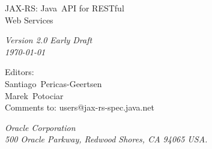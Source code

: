 \begin{titlepage}
\raggedleft

\vspace*{60pt}

{\Huge
\textsf{JAX-RS: Java\texttrademark\ API for RESTful\\\vspace{10pt}
 Web Services}}

\vspace{20pt}

{
\Large\textit{Version 2.0 Early Draft\\
\today}
}

\vspace{40pt}

{\large Editors:\\
Santiago\ Pericas-Geertsen\\
Marek\ Potociar\\
\vspace{10pt}Comments to: users@jax-rs-spec.java.net
}

\vspace{80pt}

{\small\textit{Oracle Corporation\\
500 Oracle Parkway, Redwood Shores, CA 94065 USA.}
}
\end{titlepage} 
